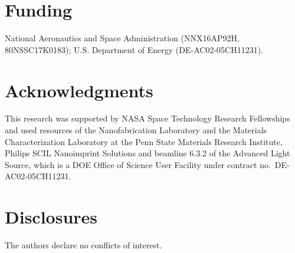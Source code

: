 \documentclass{osa-article}
\begin{document}
\section*{Funding}
National Aeronautics and Space Administration (NNX16AP92H, 80NSSC17K0183); U.S. Department of Energy (DE-AC02-05CH11231).


\section*{Acknowledgments}
This research was supported by NASA Space Technology Research Fellowships and used resources of the Nanofabrication Laboratory and the Materials Characterization Laboratory at the Penn State Materials Research Institute, Philips SCIL Nanoimprint Solutions and beamline 6.3.2 of the Advanced Light Source, which is a DOE Office of Science User Facility under contract no.\ DE-AC02-05CH11231.

\section*{Disclosures}
The authors declare no conflicts of interest.





\end{document}
